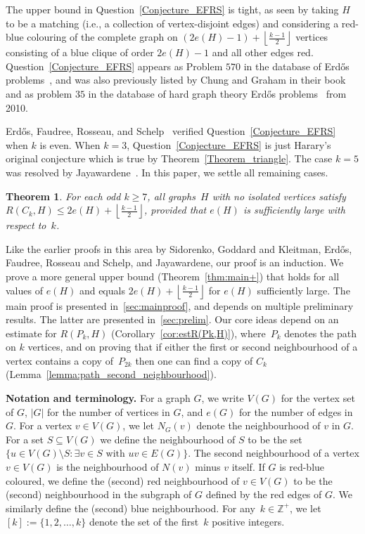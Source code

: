 \documentclass{article}
\newtheorem{theorem}{Theorem}
\newcommand*{\floorfrac}[2]{\mathopen{}\left\lfloor\frac{#1}{#2}\right\rfloor\mathclose{}}
\begin{document}
    The upper bound in Question~\ref{Conjecture_EFRS} is tight, as seen by taking $H$ to be a matching (i.e., a collection of vertex-disjoint edges) and considering a red-blue colouring of the complete graph on $(2e(H)-1)+\floorfrac{k-1}{2}$ vertices consisting of a blue clique of order $2e(H)-1$ and all other edges red.
    Question~\ref{Conjecture_EFRS} appears as Problem $570$ in the database of Erd\H{o}s problems~\cite{BloomErdosProblems}, and was also previously listed by Chung and Graham in their book~\cite{chung1998erdos} and as problem $35$ in the database of hard graph theory Erd\H{o}s problems~\cite{ChungErdosProblems} from 2010.


    Erd\H{o}s, Faudree, Rosseau, and Schelp~\cite{EFRS93} verified Question~\ref{Conjecture_EFRS} when $k$ is even.
    When $k=3$, Question~\ref{Conjecture_EFRS} is just Harary's original conjecture which is true by Theorem~\ref{Theorem_triangle}.
    The case $k=5$ was resolved by Jayawardene~\cite{jayawardene1999thesis}. 
    In this paper, we settle all remaining cases.
    
    \begin{theorem}\label{theorem:main}
    For each odd $k\ge 7$, all graphs~$H$ with no isolated vertices satisfy $R(C_k, H)\le 2e(H)+\left \lfloor \frac{k-1}{2} \right \rfloor $, provided that $e(H)$ is sufficiently large with respect to~$k$.
    \end{theorem}

    Like the earlier proofs in this area by Sidorenko, Goddard and Kleitman, Erd\H{o}s, Faudree, Rosseau and Schelp, and Jayawardene, our proof is an induction. 
    We prove a more general upper bound (Theorem~\ref{thm:main+}) that holds for all values of $e(H)$ and equals $2e(H)+\floorfrac {k-1}2 $ for $e(H)$ sufficiently large. 
    The main proof is presented in~\cref{sec:mainproof}, and depends on multiple preliminary results.
    The latter are presented in~\cref{sec:prelim}. 
    Our core ideas depend on an estimate for $R(P_k,H)$ (Corollary~\ref{cor:estR(Pk,H)}), where~$P_k$ denotes the path on $k$ vertices, and on proving that if either the first or second neighbourhood of a vertex contains a copy of~$P_{2k}$ then one can find a copy of $C_k$ (Lemma~\ref{lemma:path_second_neighbourhood}).

    \smallskip
    
    \textbf{Notation and terminology.}
    For a graph $G$, we write $V(G)$ for the vertex set of $G$, $|G|$ for the number of vertices in $G$, and $e(G)$ for the number of edges in $G$.
    For a vertex $v \in V(G)$, we let $N_G(v)$ denote the neighbourhood of $v$ in $G$.
    For a set $S \subseteq V(G)$ we define the neighbourhood of $S$ to be the set $\{u \in V(G) \setminus S: \exists v \in S \text{ with }  uv \in E(G)\}$.
    The second neighbourhood of a vertex $v \in V(G)$ is the neighbourhood of $N(v)$ minus $v$ itself.
    If $G$ is red-blue coloured, we define the (second) red neighbourhood of $v \in V(G)$ to be the (second) neighbourhood in the subgraph of $G$ defined by the red edges of $G$.
    We similarly define the (second) blue neighbourhood.
    For any~$k\in\mathbb Z^+$, we let $[k]:=\{1,2,\dots,k\}$ denote the set of the first~$k$ positive integers.
    
\end{document}
